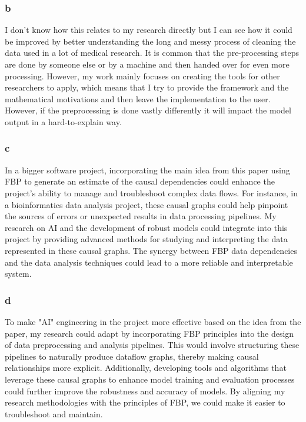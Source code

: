 \documentclass{article}
\begin{document}
\subsubsection{b}
I don't know how this relates to my research directly but I can see how it could be improved by better understanding the long and messy process of cleaning the data used in a lot of medical research. It is common that the pre-processing steps are done by someone else or by a machine and then handed over for even more processing. However, my work mainly focuses on creating the tools for other researchers to apply, which means that I try to provide the framework and the mathematical motivations and then leave the implementation to the user. However, if the preprocessing is done vastly differently it will impact the model output in a hard-to-explain way. 

\subsubsection{c}
In a bigger software project, incorporating the main idea from this paper using FBP to generate an estimate of the causal dependencies could enhance the project's ability to manage and troubleshoot complex data flows. For instance, in a bioinformatics data analysis project, these causal graphs could help pinpoint the sources of errors or unexpected results in data processing pipelines. My research on AI and the development of robust models could integrate into this project by providing advanced methods for studying and interpreting the data represented in these causal graphs. The synergy between FBP data dependencies and the data analysis techniques could lead to a more reliable and interpretable system.

\subsubsection{d}
To make "AI" engineering in the project more effective based on the idea from the paper, my research could adapt by incorporating FBP principles into the design of data preprocessing and analysis pipelines. This would involve structuring these pipelines to naturally produce dataflow graphs, thereby making causal relationships more explicit. Additionally, developing tools and algorithms that leverage these causal graphs to enhance model training and evaluation processes could further improve the robustness and accuracy of models. By aligning my research methodologies with the principles of FBP, we could make it easier to troubleshoot and maintain.
\end{document}
